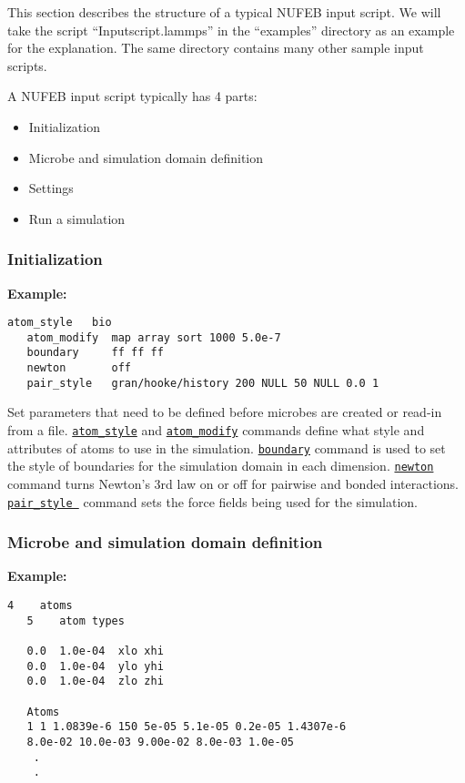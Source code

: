 \documentclass[11pt,a4paper,openright]{article}
\begin{document}
This section describes the structure of a typical NUFEB input script. We will take the script ``Inputscript.lammps'' in  the ``examples'' directory as an example for the explanation. The same directory contains many other sample input scripts.

A NUFEB input script typically has 4 parts:

\begin{itemize}
    \item Initialization
    \item Microbe and simulation domain definition
    \item Settings
    \item Run a simulation
\end{itemize} 

\subsubsection{Initialization}
\textbf{Example:}
\begin{Verbatim}[frame=single]
   atom_style   bio
   atom_modify  map array sort 1000 5.0e-7
   boundary     ff ff ff
   newton       off
   pair_style   gran/hooke/history 200 NULL 50 NULL 0.0 1
\end{Verbatim}

Set parameters that need to be defined before microbes are created or read-in from a file. 
\href{http://lammps.sandia.gov/doc/atom_style.html}{\tt atom\_style} 
and
\href{http://lammps.sandia.gov/doc/atom_modify.html}{\tt atom\_modify} commands 
define what style and attributes of atoms to use in the simulation. 
\href{http://lammps.sandia.gov/doc/boundary.html}{\tt boundary} command
is used to set the style of boundaries for the simulation domain in each dimension. 
\href{http://lammps.sandia.gov/doc/newton.html}{\tt newton} command
turns Newton's 3rd law on or off for pairwise and bonded interactions. 
\href{http://lammps.sandia.gov/doc/pair_style .html}{\tt pair\_style } command
sets the force fields being used for the simulation.

\subsubsection{Microbe and simulation domain definition}
\textbf{Example:}
\begin{Verbatim}[frame=single]
   4    atoms
   5    atom types 
    
   0.0  1.0e-04  xlo xhi 
   0.0  1.0e-04  ylo yhi 
   0.0  1.0e-04  zlo zhi 
    
   Atoms
   1 1 1.0839e-6 150 5e-05 5.1e-05 0.2e-05 1.4307e-6 
   8.0e-02 10.0e-03 9.00e-02 8.0e-03 1.0e-05 
    .
    .
\end{Verbatim}
\end{document}
